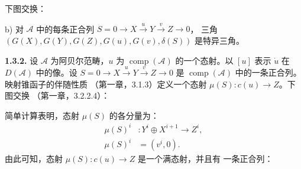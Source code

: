 \clearpage
{}%
\begingroup\small\setlength{\parskip}{0pt}\setlength{\emergencystretch}{1.5em}
\setlength{\abovedisplayskip}{4pt plus 2pt minus 2pt}%
\setlength{\belowdisplayskip}{4pt plus 2pt minus 2pt}%

下图交换：

\begin{center}
\end{center}

\noindent b) 对 $\mathcal A$ 中的每条正合列
$S=0\longrightarrow X\xrightarrow{u}Y\xrightarrow{v}Z\longrightarrow0$，
三角
$(G(X),\allowbreak G(Y),\allowbreak G(Z),\allowbreak G(u),\allowbreak
G(v),\allowbreak\delta(S))$ 是特异三角。

\medskip\noindent\textbf{1.3.2.}\quad
设 $\mathcal A$ 为阿贝尔范畴，$u$ 为
$\operatorname{comp}(\mathcal A)$ 的一个态射。以 $[u]$ 表示
$\dot u$ 在 $D(\mathcal A)$ 中的像。设
$S=0\longrightarrow X\xrightarrow{u}Y\xrightarrow{v}Z\longrightarrow0$
是 $\operatorname{comp}(\mathcal A)$ 中的一条正合列。映射锥函子的伴随性质
（第一章，3.1.3）定义一个态射
$\mu(S)\colon c(u)\longrightarrow Z$。下图交换
（第一章，3.2.2.4）：

\begin{center}
\end{center}

简单计算表明，态射 $\mu(S)$ 的各分量为：
\begin{equation}
\begin{aligned}
\mu(S)^i&\colon Y^i\oplus X^{i+1}\longrightarrow Z^i,\\
\mu(S)^i&=(v^i,0).
\end{aligned}
\tag{1.3.2.1}
\end{equation}
由此可知，态射 $\mu(S)\colon c(u)\longrightarrow Z$ 是一个满态射，并且有
一条正合列：

